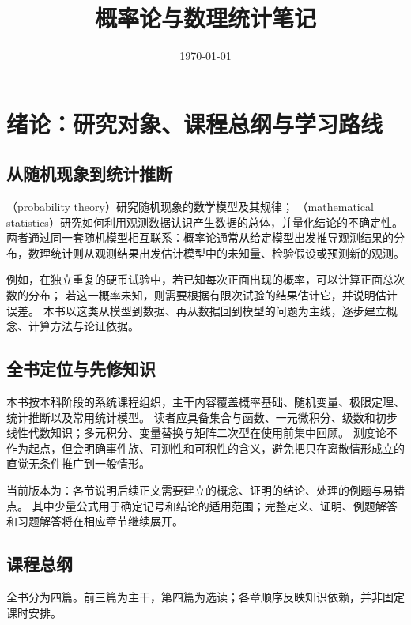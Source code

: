 \documentclass[UTF8,12pt,a4paper,fontset=fandol]{ctexbook}
\title{概率论与数理统计笔记}
\author{}
\date{\today}
\begin{document}
\maketitle
\tableofcontents
\clearpage


\chapter*{绪论：研究对象、课程总纲与学习路线}

\section*{从随机现象到统计推断}

（probability theory）研究随机现象的数学模型及其规律；
（mathematical statistics）研究如何利用观测数据认识产生数据的总体，并量化结论的不确定性。
两者通过同一套随机模型相互联系：概率论通常从给定模型出发推导观测结果的分布，数理统计则从观测结果出发估计模型中的未知量、检验假设或预测新的观测。

例如，在独立重复的硬币试验中，若已知每次正面出现的概率，可以计算正面总次数的分布；
若这一概率未知，则需要根据有限次试验的结果估计它，并说明估计误差。
本书以这类从模型到数据、再从数据回到模型的问题为主线，逐步建立概念、计算方法与论证依据。

\section*{全书定位与先修知识}

本书按本科阶段的系统课程组织，主干内容覆盖概率基础、随机变量、极限定理、统计推断以及常用统计模型。
读者应具备集合与函数、一元微积分、级数和初步线性代数知识；多元积分、变量替换与矩阵二次型在使用前集中回顾。
测度论不作为起点，但会明确事件族、可测性和可积性的含义，避免把只在离散情形成立的直觉无条件推广到一般情形。

当前版本为：各节说明后续正文需要建立的概念、证明的结论、处理的例题与易错点。
其中少量公式用于确定记号和结论的适用范围；完整定义、证明、例题解答和习题解答将在相应章节继续展开。

\section*{课程总纲}

全书分为四篇。前三篇为主干，第四篇为选读；各章顺序反映知识依赖，并非固定课时安排。
\end{document}
